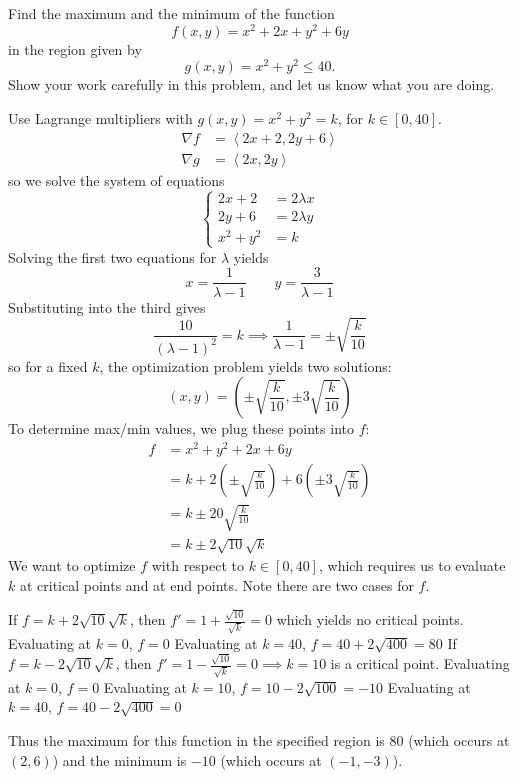 \documentclass[12pt,answers]{exam}
\newcommand{\vect}[1]{\left\langle #1\right\rangle}
\begin{document}
\begin{questions}
	\newpage
	\question[20]
	Find the maximum and the minimum of the function
	\[
		f(x,y) = x^2 + 2x + y^2 + 6y
	\]
	in the region given by 
	\[
		g(x,y) = x^2 + y^2 \le 40.
	\]
	Show your work carefully in this problem, and let us know what you are doing.
	\begin{solution}
		Use Lagrange multipliers with $g(x,y) = x^2 + y^2 = k$, for $k \in [0, 40]$.
		\begin{align*}
			\nabla f &= \vect{2x + 2, 2y+6}\\
			\nabla g &= \vect{2x, 2y}
		\end{align*}
		so we solve the system of equations
		\[
			\left\{
				\begin{aligned}
					2x+2 &= 2\lambda x \\ 
					2y+6 &= 2\lambda y \\ 
					x^2 + y^2 &= k
				\end{aligned}
			\right.
		\]
		Solving the first two equations for $\lambda$ yields
		\[
			x = \frac{1}{\lambda - 1} \qquad y = \frac{3}{\lambda-1}
		\]
		Substituting into the third gives 
		\[
			\frac{10}{(\lambda-1)^2} = k \implies \frac{1}{\lambda-1} = \pm \sqrt{\frac{k}{10}}
		\]
		so for a fixed $k$, the optimization problem yields two solutions:
		\[
			(x, y) = \left( \pm \sqrt{\frac{k}{10}}, \pm 3 \sqrt{\frac{k}{10}} \right)
		\]
		To determine max/min values, we plug these points into $f$:
		\begin{align*}
			f &= x^2 + y^2 + 2x + 6y \\
			&= k + 2\left(\pm \sqrt{\frac{k}{10}}\right) + 6\left( \pm 3 \sqrt{\frac{k}{10}} \right)  \\
			&= k \pm 20 \sqrt{\frac{k}{10}} \\
			&= k \pm 2 \sqrt{10}\sqrt{k}
		\end{align*}
		We want to optimize $f$ with respect to $k \in [0,40]$, which requires us to evaluate $k$ at critical points and at end points.
		Note there are two cases for $f$. 
		\begin{outline}
			\1 If $f = k + 2 \sqrt{10} \sqrt{k}$, then $f' = 1 + \frac{\sqrt{10}}{\sqrt k} = 0$ which yields no critical points. 
			\2 Evaluating at $k = 0$, $f = 0$
			\2 Evaluating at $k = 40$, $f = 40 + 2 \sqrt{400} = 80$
			\1 If $f = k -2 \sqrt{10} \sqrt{k}$, then $f' = 1 - \frac{\sqrt{10}}{\sqrt{k}} = 0 \implies k = 10$ is a critical point.
			\2 Evaluating at $k = 0$, $f = 0$
			\2 Evaluating at $k = 10$, $f = 10 - 2\sqrt{100} = -10$
			\2 Evaluating at $k = 40$, $f = 40 - 2 \sqrt{400} = 0$
		\end{outline}
		Thus the maximum for this function in the specified region is 80 (which occurs at $(2, 6)$) and the minimum is $-10$ (which occurs at $(-1, -3)$).
	\end{solution}


\end{questions}
\end{document}
